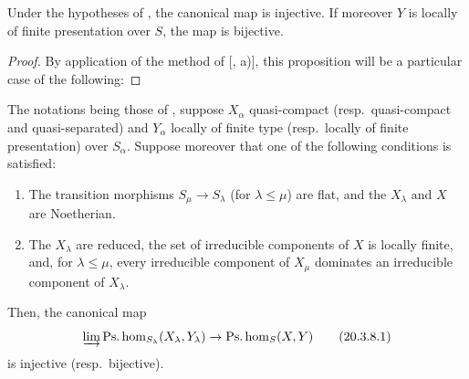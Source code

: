 \begin{proposition}[20.3.7]
\label{IV.20.3.7}
Under the hypotheses of , the canonical map  is injective.
If moreover $Y$ is locally of finite presentation over $S$, the map  is bijective.
\end{proposition}

\begin{proof}
By application of the method of [, a)], this proposition will be a particular case of the following:
\end{proof}

\begin{proposition}[20.3.8]
\label{IV.20.3.8}
The notations being those of , suppose $X_\alpha$ quasi-compact (resp.\ quasi-compact and quasi-separated) and $Y_\alpha$ locally of finite type (resp.\ locally of finite presentation) over $S_\alpha$.
Suppose moreover that one of the following conditions is satisfied:
\begin{enumerate}[label=\emph{(\roman*)}]
  \item The transition morphisms $S_\mu\to S_\lambda$ (for $\lambda\leq\mu$) are flat, and the $X_\lambda$ and $X$ are Noetherian.
  \item The $X_\lambda$ are reduced, the set of irreducible components of $X$ is locally finite, and, for $\lambda\leq\mu$, every irreducible component of $X_\mu$ dominates an irreducible component of $X_\lambda$.
\end{enumerate}
Then, the canonical map
\[
\label{IV.20.3.8.1}
  \varinjlim\operatorname{Ps.hom}_{S_\lambda}(X_\lambda,Y_\lambda)\to\operatorname{Ps.hom}_S(X,Y)
  \tag{20.3.8.1}
\]
is injective (resp.\ bijective).
\end{proposition}

